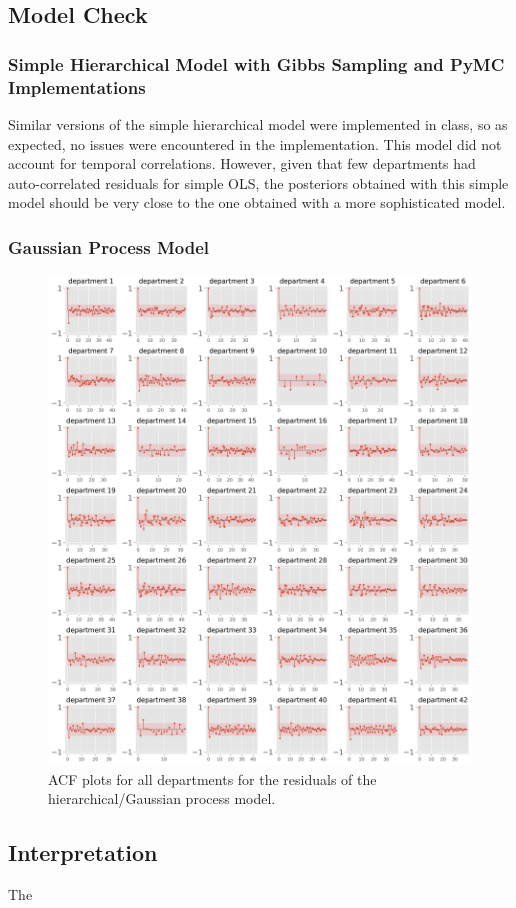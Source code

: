 \documentclass[paper=a4, fontsize=11pt]{scrartcl}
\begin{document}
\subsection{Model Check}

\subsubsection{Simple Hierarchical Model with Gibbs Sampling and PyMC Implementations}
Similar versions of the simple hierarchical model were implemented in class, so as expected, no issues were encountered in the implementation. This model did not account for temporal correlations. However, given that few departments had auto-correlated residuals for simple OLS, the posteriors obtained with this simple model should be very close to the one obtained with a more sophisticated model. 


\subsubsection{Gaussian Process Model}


\begin{figure}[h]\label{autocorr_after}
\centering
\includegraphics[width=1\textwidth]{acf_plots_after.png}
\caption{ACF plots for all departments for the residuals of the hierarchical/Gaussian process model.}
\end{figure}



\subsection{Interpretation}
The 


 

\end{document}
